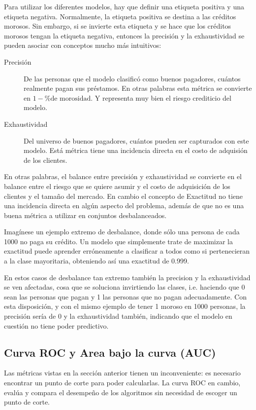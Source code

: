 Para utilizar los diferentes modelos, hay que definir una etiqueta positiva y una etiqueta negativa. Normalmente, la etiqueta positiva se destina a las créditos morosos. Sin embargo, si se invierte esta etiqueta y se hace que los créditos morosos tengan la etiqueta negativa, entonces la precisión y la exhaustividad se pueden asociar con conceptos mucho más intuitivos:

\begin{description}
	\item [Precisión] De las personas que el modelo clasificó como buenos pagadores, cuántos realmente pagan sus préstamos. En otras palabras esta métrica se convierte en $1 - \text{\% de morosidad}$. Y representa muy bien el riesgo crediticio del modelo.
	\item [Exhaustividad] Del universo de buenos pagadores, cuántos pueden ser capturados con este modelo. Está métrica tiene una incidencia directa en el costo de adquisión de los clientes.
\end{description}

En otras palabras, el balance entre precisión y exhaustividad se convierte en el balance entre el riesgo que se quiere asumir y el costo de adquisición de los clientes y el tamaño del mercado. En cambio el concepto de Exactitud no tiene una incidencia directa en algún aspecto del problema, además de que no es una buena métrica a utilizar en conjuntos desbalanceados.

Imagínese un ejemplo extremo de desbalance, donde sólo una persona de cada 1000 no paga su crédito. Un modelo que simplemente trate de maximizar la exactitud puede aprender erróneamente a clasificar a todos como si pertenecieran a la clase mayoritaria, obteniendo así una exactitud de 0.999.

En estos casos de desbalance tan extremo también la precision y la exhaustividad se ven afectadas, cosa que se soluciona invirtiendo las clases, i.e. haciendo que 0 sean las personas que pagan y 1 las personas que no pagan adecuadamente. Con esta disposición, y con el mismo ejemplo de tener 1 moroso en 1000 personas, la precisión sería de 0 y la exhaustividad también, indicando que el modelo en cuestión no tiene poder predictivo.

\subsection{Curva ROC y Area bajo la curva (AUC)}

Las métricas vistas en la sección anterior tienen un inconveniente: es necesario encontrar un punto de corte para poder calcularlas. La curva ROC en cambio, evalúa y compara el desempeño de los algoritmos sin necesidad de escoger un punto de corte.

